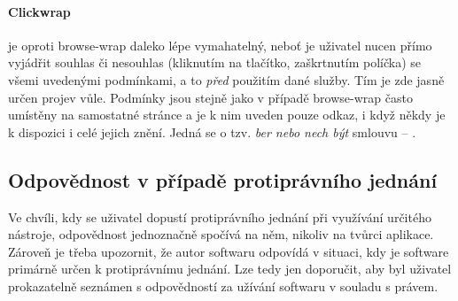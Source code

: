 \documentclass[thesis=B,czech]{FITthesis}[2012/06/26]
\begin{document}
\paragraph{Clickwrap}\label{def:clickwrap} je oproti browse-wrap daleko lépe vymahatelný, neboť je uživatel nucen přímo vyjádřit souhlas či nesouhlas (kliknutím na tlačítko, zaškrtnutím políčka) se všemi uvedenými podmínkami, a to \emph{před} použitím dané služby. Tím je zde jasně určen projev vůle. Podmínky jsou stejně jako v případě browse-wrap často umístěny na samostatné stránce a je k nim uveden pouze odkaz, i když někdy je k dispozici i celé jejich znění. Jedná se o tzv. \emph{ber nebo nech být} smlouvu -- \cite[překlad autora]{take_it_or_leave_it}.\cite{click_wrap}

\subsection{Odpovědnost v případě protiprávního jednání}
Ve chvíli, kdy se uživatel dopustí protiprávního jednání při využívání určitého nástroje, odpovědnost jednoznačně spočívá na něm, nikoliv na tvůrci aplikace. Zároveň je třeba upozornit, že autor softwaru odpovídá v situaci, kdy je software primárně určen k protiprávnímu jednání. Lze tedy jen doporučit, aby byl uživatel prokazatelně seznámen s odpovědností za užívání softwaru v souladu s právem.\cite{rozhovor}
\end{document}
